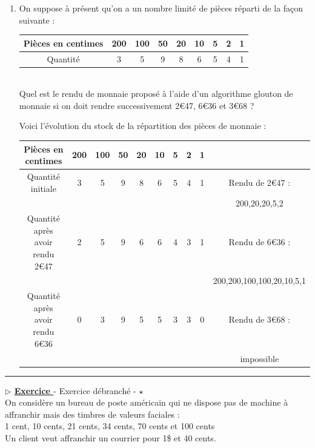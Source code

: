 \documentclass[12pt,french]{article}
\newcounter{npb}
\newcommand{\exo}{
    \stepcounter{npb}
    {\textbf{$\triangleright$ \underline{Exercice \arabic{npb} }}}
}
\begin{document}
\begin{enumerate}
\begin{enumerate}
	\end{enumerate}
\item On suppose à présent qu'on a un nombre limité de pièces réparti de la façon suivante :\\
\begin{tabular}{|c|c|c|c|c|c|c|c|c|}
	\hline
	Pièces en centimes&200&100&50&20&10&5&2&1\\
	\hline
	Quantité&3&5&9&8&6&5&4&1\\
	\hline
	\end{tabular}\\
 Quel est le rendu de monnaie proposé à l'aide d'un algorithme glouton de monnaie si on doit rendre successivement 2\euro 47, 6\euro 36 et 3\euro 68 ?
 
\begin{tcolorbox}[enhanced,width=19cm,attach boxed title to top center={yshift=-3mm,yshifttext=-1mm},
	colback=blue!5!white,colframe=blue!75!black,colbacktitle=blue!25!black,
	title=solution :, fonttitle=\bfseries,
	boxed title style={size=small,colframe=green!25!black} ]
  Voici l'évolution du stock de la répartition des pièces de monnaie :\\
\begin{tabular}{|c|c|c|c|c|c|c|c|c|c|}
	\hline
	Pièces en centimes&200&100&50&20&10&5&2&1&\\
	\hline
	Quantité initiale&3&5&9&8&6&5&4&1&Rendu de 2\euro 47 :\\
	&&&&&&&&& 200,20,20,5,2\\
	\hline
	Quantité après avoir rendu 2\euro 47&2&5&9&6&6&4&3&1&Rendu de 6\euro 36 :\\
	&&&&&&&&&  200,200,100,100,20,10,5,1\\
	\hline
	Quantité après avoir rendu 6\euro 36&0&3&9&5&5&3&3&0&Rendu de 3\euro 68 :\\
	&&&&&&&&& impossible\\
	\hline	
\end{tabular}
\end{tcolorbox} 
\end{enumerate}
\hrule
\medskip
\exo - Exercice débranché - $\star$ \\
On considère un bureau de poste américain qui ne dispose pas de machine à affranchir mais des timbres de valeurs faciales :\\
1 cent, 10 cents, 21 cents, 34 cents, 70 cents et 100 cents\\
Un client veut affranchir un courrier pour 1\$ et 40 cents.
\end{document}
